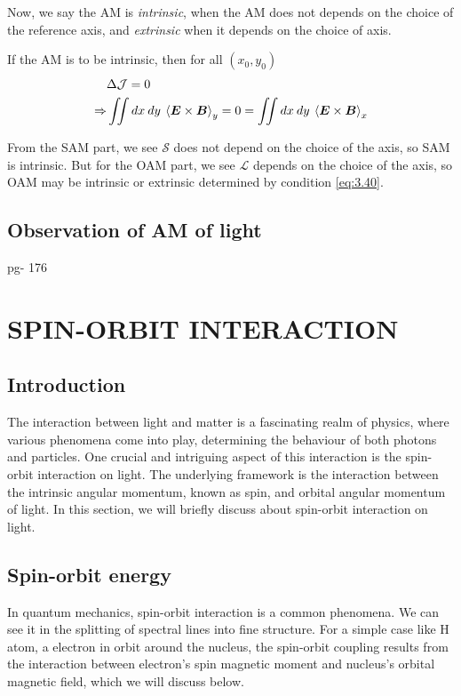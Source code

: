 \documentclass[11pt,a4paper]{article}
\numberwithin{equation}{section}
\begin{document}
Now, we say the AM is \textit{intrinsic}, when the AM does not depends on the choice of the reference axis, and \textit{extrinsic} when it depends on the choice of axis.

If the AM is to be intrinsic, then for all $(x_0,y_0)$
\begin{align}
	&\Delta\mathcal{J}=0\nonumber\\
	\Rightarrow &\iint  dx\:dy\: \expval{\boldsymbol{E}\times\boldsymbol{B}}_y = 0 = \iint  dx\:dy\: \expval{\boldsymbol{E}\times\boldsymbol{B}}_x \label{eq:3.40}
\end{align} 

From the SAM part, we see $\mathcal{S}$ does not depend on the choice of the axis, so SAM is intrinsic. But for the OAM part, we see $\mathcal{L}$ depends on the choice of the axis, so OAM may be intrinsic or extrinsic determined by condition \ref{eq:3.40}.

\subsection{\color{red} Observation of AM of light}
\cite{yao 11} pg- 176

\clearpage

\section{SPIN-ORBIT INTERACTION}

\subsection{Introduction}
The interaction between light and matter is a fascinating realm of physics, where various phenomena come into play, determining the behaviour of both photons and particles. One crucial and intriguing aspect of this interaction is the spin-orbit interaction on light. The underlying framework is the interaction between the intrinsic angular momentum, known as spin, and  orbital angular momentum of light. In this section, we will briefly discuss about spin-orbit interaction on light.
\subsection{Spin-orbit energy}
In quantum mechanics, spin-orbit interaction is a common phenomena. We can see it in the splitting of spectral lines into fine structure. For a simple case like H atom, a electron in orbit around the nucleus, the spin-orbit coupling results from the interaction between electron's spin magnetic moment and nucleus's orbital magnetic field, which we will discuss below. \cite{WO}\cite{zettili 09} 
\end{document}
